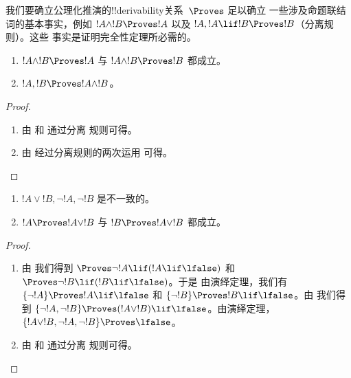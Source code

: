 \documentclass[../../../include/open-logic-section]{subfiles}
\begin{document}
      {}
      {}


\begin{explain}
  我们要确立公理化推演的!!{derivability}关系~$\Proves$ 足以确立
  一些涉及命题联结词的基本事实，例如 $!A \land !B
  \Proves !A$ 以及 $!A, !A \lif !B \Proves !B$（分离规则）。这些
  事实是证明完全性定理所必需的。
\end{explain}

\begin{prop}
  \begin{enumerate}
  \item {} $!A \land !B \Proves
    !A$ 与 $!A \land !B \Proves !B$ 都成立。
  \item {} $!A, !B \Proves !A \land !B$。
  \end{enumerate}
\end{prop}

\begin{proof}
  \begin{enumerate}
    \item 由  和  通过分离
      规则可得。
  \item 由  经过分离规则的两次运用
    可得。
  \end{enumerate}
\end{proof}


\begin{prop}
  \begin{enumerate}
  \item $!A \lor !B, \lnot !A, \lnot !B$ 是不一致的。
  \item $!A \Proves !A \lor !B$ 与 $!B \Proves !A \lor !B$ 都成立。
  \end{enumerate}
\end{prop}

\begin{proof}
  \begin{enumerate}
  \item 由  我们得到 $\Proves \lnot !A \lif (!A
    \lif \lfalse)$ 和 $\Proves \lnot !B \lif (!B \lif \lfalse)$。于是
    由演绎定理，我们有 $\{\lnot !A\} \Proves !A \lif
    \lfalse$ 和 $\{\lnot !B\} \Proves !B \lif \lfalse$。由
     我们得到 $\{\lnot !A, \lnot !B\} \Proves (!A
    \lor !B) \lif \lfalse$。由演绎定理，$\{!A \lor !B,
    \lnot !A, \lnot !B\} \Proves \lfalse$。
  \item 由  和  通过分离
    规则可得。
  \end{enumerate}
\end{proof}
\end{document}
